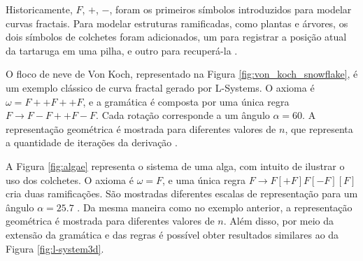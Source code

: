 \vspace{0.5cm}

Historicamente, $F$, $+$, $-$, foram os primeiros símbolos introduzidos para modelar curvas fractais. Para modelar estruturas ramificadas, como plantas e árvores, os dois símbolos de colchetes foram adicionados, um para registrar a posição atual da tartaruga em uma pilha, e outro para recuperá-la \cite{simon2011}.

O floco de neve de Von Koch, representado na Figura \ref{fig:von_koch_snowflake}, é um exemplo clássico de curva fractal gerado por \gls{L-Systems}. O axioma é $\omega = F ++ F ++ F$, e a gramática é composta por uma única regra $F \rightarrow F - F ++ F - F$. Cada rotação corresponde a um ângulo $\alpha = 60$. A representação geométrica é mostrada para diferentes valores de $n$, que representa a quantidade de iterações da derivação \cite{simon2011}.
	
\begin{figure}[h!]
	\centering
	\captionsetup{width=15cm}
	{}	
\end{figure}

A Figura \ref{fig:algae} representa o sistema de uma alga, com intuito de ilustrar o uso dos colchetes. O axioma é $\omega = F$, e uma única regra $F \rightarrow F [+F] F [-F] [F]$ cria duas ramificações. São mostradas diferentes escalas de representação para um ângulo $\alpha = 25.7$ \cite{simon2011}. Da mesma maneira como no exemplo anterior, a representação geométrica é mostrada para diferentes valores de $n$. Além disso, por meio da extensão da gramática e das regras é possível obter resultados similares ao da Figura \ref{fig:l-system3d}.

\begin{figure}[h!]
	\centering
	\captionsetup{width=15cm}
	{}	
\end{figure}

